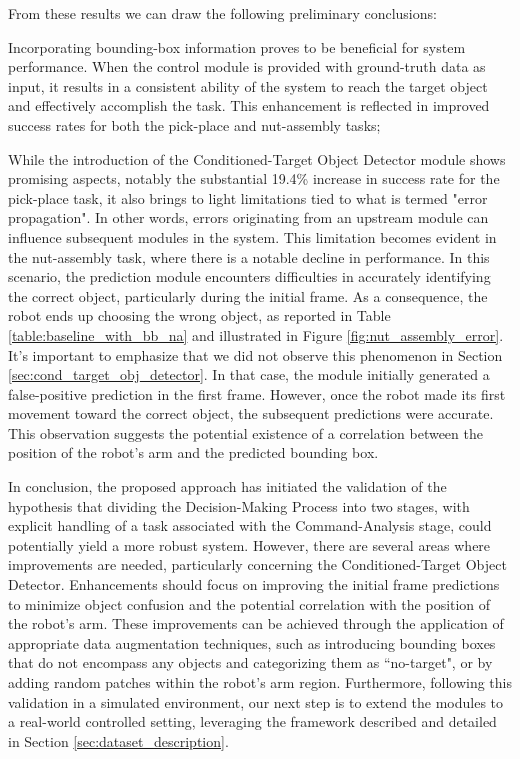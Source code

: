 From these results we can draw the following preliminary conclusions: \begin{enumerate*}[label=(\arabic*)]
    \item Incorporating bounding-box information proves to be beneficial for system performance. When the control module is provided with ground-truth data as input, it results in a consistent ability of the system to reach the target object and effectively accomplish the task. This enhancement is reflected in improved success rates for both the pick-place and nut-assembly tasks;
    \item While the introduction of the Conditioned-Target Object Detector module shows promising aspects, notably the substantial 19.4\% increase in success rate for the pick-place task, it also brings to light limitations tied to what is termed "error propagation". In other words, errors originating from an upstream module can influence subsequent modules in the system. This limitation becomes evident in the nut-assembly task, where there is a notable decline in performance. In this scenario, the prediction module encounters difficulties in accurately identifying the correct object, particularly during the initial frame. As a consequence, the robot ends up choosing the wrong object, as reported in Table \ref{table:baseline_with_bb_na} and illustrated in Figure \ref{fig:nut_assembly_error}. It's important to emphasize that we did not observe this phenomenon in Section \ref{sec:cond_target_obj_detector}. In that case, the module initially generated a false-positive prediction in the first frame. However, once the robot made its first movement toward the correct object, the subsequent predictions were accurate. This observation suggests the potential existence of a correlation between the position of the robot's arm and the predicted bounding box.
\end{enumerate*}



In conclusion, the proposed approach has initiated the validation of the hypothesis that dividing the Decision-Making Process into two stages, with explicit handling of a task associated with the Command-Analysis stage, could potentially yield a more robust system. However, there are several areas where improvements are needed, particularly concerning the Conditioned-Target Object Detector. Enhancements should focus on improving the initial frame predictions to minimize object confusion and the potential correlation with the position of the robot's arm. These improvements can be achieved through the application of appropriate data augmentation techniques, such as introducing bounding boxes that do not encompass any objects and categorizing them as ``no-target", or by adding random patches within the robot's arm region. Furthermore, following this validation in a simulated environment, our next step is to extend the modules to a real-world controlled setting, leveraging the framework described and detailed in Section \ref{sec:dataset_description}.